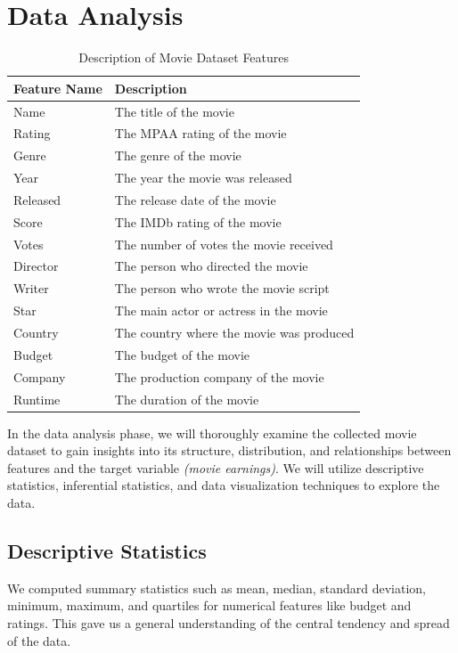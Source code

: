 \documentclass[conference]{IEEEtran}
\begin{document}
\section{Data Analysis}
   \begin{table}[h]
    \centering
    \captionsetup{justification=centering}
    \caption{Description of Movie Dataset Features}
    \label{tab:movie_dataset_features}
    \renewcommand{\arraystretch}{1.5}
    \begin{tabular}{>{\centering\arraybackslash}m{1cm} >{\centering\arraybackslash}m{6cm}}
        \toprule
        \textbf{Feature Name} & \textbf{Description} \\
        \midrule
        Name & The title of the movie \\
        Rating & The MPAA rating of the movie \\
        Genre & The genre of the movie \\
        Year & The year the movie was released \\
        Released & The release date of the movie \\
        Score & The IMDb rating of the movie \\
        Votes & The number of votes the movie received \\
        Director & The person who directed the movie \\
        Writer & The person who wrote the movie script \\
        Star & The main actor or actress in the movie \\
        Country & The country where the movie was produced \\
        Budget & The budget of the movie \\
        Company & The production company of the movie \\
        Runtime & The duration of the movie \\
        \bottomrule
    \end{tabular}
\end{table}

    In the data analysis phase, we will thoroughly examine the collected movie dataset to gain insights into its structure, distribution, and relationships between features and the target variable \textit{(movie earnings)}. We will utilize descriptive statistics, inferential statistics, and data visualization techniques to explore the data.

    \subsection{Descriptive Statistics}
        We computed summary statistics such as mean, median, standard deviation, minimum, maximum, and quartiles for numerical features like budget and ratings. This gave us a general understanding of the central tendency and spread of the data.
\end{document}
